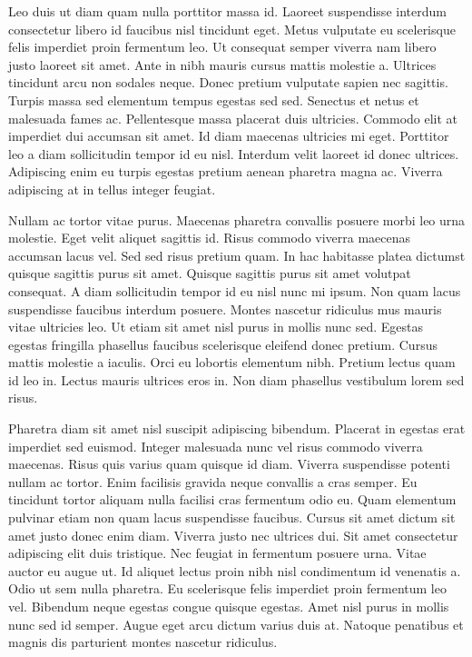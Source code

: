\documentclass[11pt,a4paper]{article}
\begin{document}
Leo duis ut diam quam nulla porttitor massa id. Laoreet suspendisse interdum consectetur libero id faucibus nisl tincidunt eget. Metus vulputate eu scelerisque felis imperdiet proin fermentum leo. Ut consequat semper viverra nam libero justo laoreet sit amet. Ante in nibh mauris cursus mattis molestie a. Ultrices tincidunt arcu non sodales neque. Donec pretium vulputate sapien nec sagittis. Turpis massa sed elementum tempus egestas sed sed. Senectus et netus et malesuada fames ac. Pellentesque massa placerat duis ultricies. Commodo elit at imperdiet dui accumsan sit amet. Id diam maecenas ultricies mi eget. Porttitor leo a diam sollicitudin tempor id eu nisl. Interdum velit laoreet id donec ultrices. Adipiscing enim eu turpis egestas pretium aenean pharetra magna ac. Viverra adipiscing at in tellus integer feugiat.

Nullam ac tortor vitae purus. Maecenas pharetra convallis posuere morbi leo urna molestie. Eget velit aliquet sagittis id. Risus commodo viverra maecenas accumsan lacus vel. Sed sed risus pretium quam. In hac habitasse platea dictumst quisque sagittis purus sit amet. Quisque sagittis purus sit amet volutpat consequat. A diam sollicitudin tempor id eu nisl nunc mi ipsum. Non quam lacus suspendisse faucibus interdum posuere. Montes nascetur ridiculus mus mauris vitae ultricies leo. Ut etiam sit amet nisl purus in mollis nunc sed. Egestas egestas fringilla phasellus faucibus scelerisque eleifend donec pretium. Cursus mattis molestie a iaculis. Orci eu lobortis elementum nibh. Pretium lectus quam id leo in. Lectus mauris ultrices eros in. Non diam phasellus vestibulum lorem sed risus.

Pharetra diam sit amet nisl suscipit adipiscing bibendum. Placerat in egestas erat imperdiet sed euismod. Integer malesuada nunc vel risus commodo viverra maecenas. Risus quis varius quam quisque id diam. Viverra suspendisse potenti nullam ac tortor. Enim facilisis gravida neque convallis a cras semper. Eu tincidunt tortor aliquam nulla facilisi cras fermentum odio eu. Quam elementum pulvinar etiam non quam lacus suspendisse faucibus. Cursus sit amet dictum sit amet justo donec enim diam. Viverra justo nec ultrices dui. Sit amet consectetur adipiscing elit duis tristique. Nec feugiat in fermentum posuere urna. Vitae auctor eu augue ut. Id aliquet lectus proin nibh nisl condimentum id venenatis a. Odio ut sem nulla pharetra. Eu scelerisque felis imperdiet proin fermentum leo vel. Bibendum neque egestas congue quisque egestas. Amet nisl purus in mollis nunc sed id semper. Augue eget arcu dictum varius duis at. Natoque penatibus et magnis dis parturient montes nascetur ridiculus.
\end{document}
